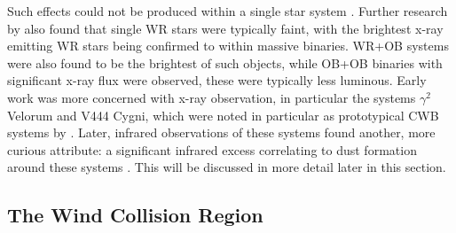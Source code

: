 \noindent
Such effects could not be produced within a single star system \parencite{pittard_x-ray_1999}.
Further research by \textcite{pollockEinsteinViewWolfRayet1987} also found that single WR stars were typically faint, with the brightest x-ray emitting WR stars being confirmed to within massive binaries.
WR+OB systems were also found to be the brightest of such objects, while OB+OB binaries with significant x-ray flux were observed, these were typically less luminous.
Early work was more concerned with x-ray observation, in particular the systems $\gamma^2$ Velorum and V444 Cygni, which were noted in particular as prototypical CWB systems by \textcite{prilutskii_x_1976}.
Later, infrared observations of these systems found another, more curious attribute: a significant infrared excess correlating to dust formation around these systems \parencite{williamsInfraredPhotometryLatetype1987}.
This will be discussed in more detail later in this section.

\subsection{The Wind Collision Region}
\label{sec:wcr}

